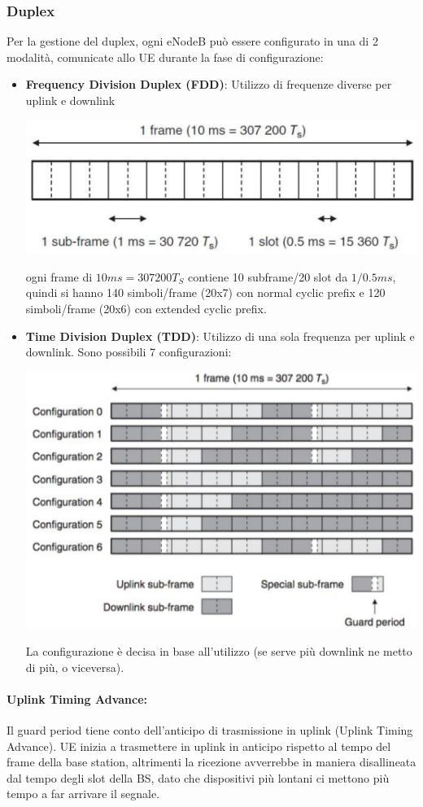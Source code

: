 \subsubsection{Duplex}

Per la gestione del duplex, ogni eNodeB può essere configurato in una di 2 modalità, comunicate allo UE durante la fase di configurazione: 
\begin{itemize}
	\item \textbf{Frequency Division Duplex (FDD)}: Utilizzo di frequenze diverse per uplink e downlink
	\begin{center}
		\includegraphics[width=0.5\linewidth]{img/4g/fdd}
	\end{center}
	ogni frame di $10ms = 307200 T_S$ contiene 10 subframe/20 slot da $1/0.5ms$, quindi si hanno 140 simboli/frame (20x7) con normal cyclic prefix e 120 simboli/frame (20x6) con extended cyclic prefix.
	
	\item \textbf{Time Division Duplex (TDD)}: Utilizzo di una sola frequenza per uplink e downlink. Sono possibili 7 configurazioni:
	\begin{center}
		\includegraphics[width=0.7\linewidth]{img/4g/tdd}
	\end{center}
	La configurazione è decisa in base all'utilizzo (se serve più downlink ne metto di più, o viceversa).
\end{itemize}

\paragraph{Uplink Timing Advance:} Il guard period tiene conto dell'anticipo di trasmissione in uplink (Uplink Timing Advance). UE inizia a trasmettere in uplink in anticipo rispetto al tempo del frame della base station, altrimenti la ricezione avverrebbe in maniera disallineata dal tempo degli slot della BS, dato che dispositivi più lontani ci mettono più tempo a far arrivare il segnale. 

